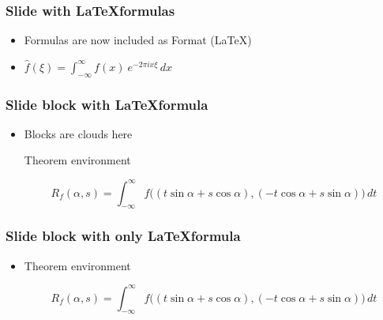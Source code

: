 \documentclass[usepdftitle=false,professionalfonts,compress ]{beamer}
\begin{document}
{
\begin{frame}\frametitle{Slide with \LaTeX formulas}
	\begin{itemize}

		\item Formulas are now included as Format (\LaTeX)
		\item  $\hat{f}(\xi) = \int_{-\infty}^\infty f(x)\ e^{- 2\pi i x \xi}\,dx$

	\end{itemize}

\end{frame}
}




{
\begin{frame}\frametitle{Slide block with \LaTeX formula}
	\begin{itemize}

		\item Blocks are clouds here
\begin{block}{Theorem environment}


\begin{equation}R_f(\alpha,s) = \int_{-\infty}^{\infty} f\big(  (t\sin\alpha+s\cos\alpha), (-t\cos\alpha+s\sin\alpha) \big)\, dt\end{equation}

		\end{block}	\end{itemize}

\end{frame}
}




{
\begin{frame}\frametitle{Slide block with {\color{red} \textbf{only}} \LaTeX formula}
	\begin{itemize}

		\item []
\begin{block}{Theorem environment}


\begin{equation}R_f(\alpha,s) = \int_{-\infty}^{\infty} f\big(  (t\sin\alpha+s\cos\alpha), (-t\cos\alpha+s\sin\alpha) \big)\, dt\end{equation}

		\end{block}	\end{itemize}

\end{frame}
}
\end{document}
